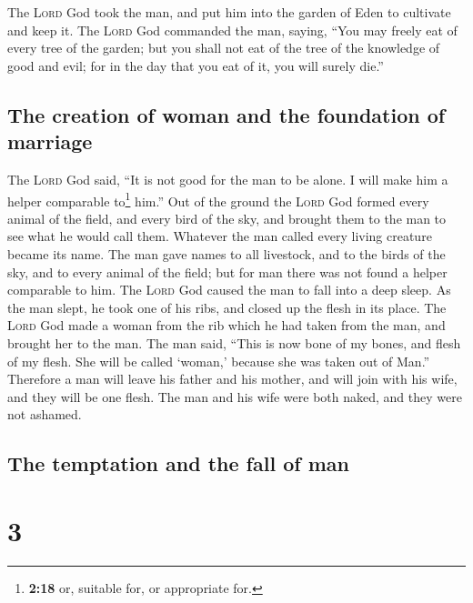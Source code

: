  The \textsc{Lord} God took the man, and put him into the
garden of Eden to cultivate and keep it.  The
\textsc{Lord} God commanded the man, saying, ``You may freely eat of
every tree of the garden;  but you shall not eat of the
tree of the knowledge of good and evil; for in the day that you eat of
it, you will surely die.''

\hypertarget{the-creation-of-woman-and-the-foundation-of-marriage}{%
\subsection{The creation of woman and the foundation of
marriage}\label{the-creation-of-woman-and-the-foundation-of-marriage}}

 The \textsc{Lord} God said, ``It is not good for the man
to be alone. I will make him a helper comparable to\footnote{\textbf{2:18}
  or, suitable for, or appropriate for.} him.''  Out of
the ground the \textsc{Lord} God formed every animal of the field, and
every bird of the sky, and brought them to the man to see what he would
call them. Whatever the man called every living creature became its
name.  The man gave names to all livestock, and to the
birds of the sky, and to every animal of the field; but for man there
was not found a helper comparable to him.  The
\textsc{Lord} God caused the man to fall into a deep sleep. As the man
slept, he took one of his ribs, and closed up the flesh in its place.
 The \textsc{Lord} God made a woman from the rib which he
had taken from the man, and brought her to the man.  The
man said, ``This is now bone of my bones, and flesh of my flesh. She
will be called `woman,' because she was taken out of Man.''
 Therefore a man will leave his father and his mother,
and will join with his wife, and they will be one flesh. 
The man and his wife were both naked, and they were not ashamed.

\hypertarget{the-temptation-and-the-fall-of-man}{%
\subsection{The temptation and the fall of
man}\label{the-temptation-and-the-fall-of-man}}

\hypertarget{section-2}{%
\section{3}\label{section-2}}

